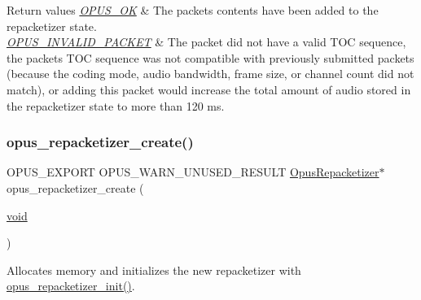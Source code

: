 \begin{DoxyRetVals}{Return values}
{\em \mbox{\hyperlink{group__opus__errorcodes_gaa44cf8a185e1b5cb940ef63eb4f02d21}{O\+P\+U\+S\+\_\+\+OK}}} & The packet\textquotesingle{}s contents have been added to the repacketizer state. \\
\hline
{\em \mbox{\hyperlink{group__opus__errorcodes_ga46fc9dd493fb8e291bd8e838f0988bb7}{O\+P\+U\+S\+\_\+\+I\+N\+V\+A\+L\+I\+D\+\_\+\+P\+A\+C\+K\+ET}}} & The packet did not have a valid T\+OC sequence, the packet\textquotesingle{}s T\+OC sequence was not compatible with previously submitted packets (because the coding mode, audio bandwidth, frame size, or channel count did not match), or adding this packet would increase the total amount of audio stored in the repacketizer state to more than 120 ms. \\
\hline
\end{DoxyRetVals}
\mbox{\label{group__opus__repacketizer_gaa70e9708619188f673b5dc3f494c46ea}} 
\subsubsection{\texorpdfstring{opus\_repacketizer\_create()}{opus\_repacketizer\_create()}}
{\footnotesize\ttfamily O\+P\+U\+S\+\_\+\+E\+X\+P\+O\+RT O\+P\+U\+S\+\_\+\+W\+A\+R\+N\+\_\+\+U\+N\+U\+S\+E\+D\+\_\+\+R\+E\+S\+U\+LT \mbox{\hyperlink{group__opus__repacketizer_ga1f85070a64bcbf5bf24f5ccb80323e7b}{Opus\+Repacketizer}}$\ast$ opus\+\_\+repacketizer\+\_\+create (\begin{DoxyParamCaption}\item[{\mbox{\hyperlink{_s_d_l__opengles2__gl2ext_8h_ae5d8fa23ad07c48bb609509eae494c95}{void}}}]{ }\end{DoxyParamCaption})}

Allocates memory and initializes the new repacketizer with \mbox{\hyperlink{group__opus__repacketizer_gadef533688e80dcc96a32b955657aaf28}{opus\+\_\+repacketizer\+\_\+init()}}. \mbox{\label{group__opus__repacketizer_gab03f22d1139a42e450761ad99ca3d882}} 
